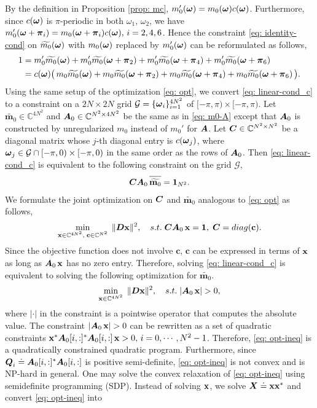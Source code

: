 By the definition in Proposition \ref{prop: mc}, $m_0'(\boldsymbol{\omega}) = m_0(\boldsymbol{\omega})c(\boldsymbol{\omega})$. Furthermore, since $c(\boldsymbol{\omega})$ is $\pi$-periodic in both $\omega_1,\,\omega_2$, we have $m_0'(\boldsymbol{\omega}+\boldsymbol{\pi}_i) = m_0(\boldsymbol{\omega}+\boldsymbol{\pi}_i)c(\boldsymbol{\omega}),\, i = 2,4,6$. Hence the constraint \eqref{eq: identity-cond} on $\widetilde{m_{0}}(\boldsymbol{\omega})$ with $m_0(\boldsymbol{\omega})$ replaced by $m_0'(\boldsymbol{\omega})$ can be reformulated as follows,
\begin{align}
1 & = m_0'\widetilde{m_{0}}(\boldsymbol{\omega}) + m_0'\widetilde{m_{0}}(\boldsymbol{\omega}+\boldsymbol{\pi}_{2}) + m_0'\widetilde{m_{0}}(\boldsymbol{\omega}+\boldsymbol{\pi}_{4}) + m_0'\widetilde{m_{0}}(\boldsymbol{\omega}+\boldsymbol{\pi}_{6})\notag\\
& = c(\boldsymbol{\omega})\big(\,m_0\widetilde{m_{0}}(\boldsymbol{\omega}) + m_0\widetilde{m_{0}}(\boldsymbol{\omega}+\boldsymbol{\pi}_{2}) + m_0\widetilde{m_{0}}(\boldsymbol{\omega}+\boldsymbol{\pi}_{4}) + m_0\widetilde{m_{0}}(\boldsymbol{\omega}+\boldsymbol{\pi}_{6})\,\big).\label{eq: linear-cond_c}
\end{align}
Using the same setup of the optimization \eqref{eq: opt}, we convert \eqref{eq: linear-cond_c} to a constraint on a $2N\times 2N$ grid $\mathcal{G}=\{\boldsymbol{\omega}_i\}_{i=1}^{4N^2}$ of $[-\pi,\pi)\times[-\pi,\pi)$.
Let $\widetilde{\mathbf{m}_0}\in\mathbb{C}^{4N^2}$ and $\boldsymbol{A}_0\in\mathbb{C}^{N^2\times 4N^2}$ be the same as in \eqref{eq: m0-A} except that $\boldsymbol{A}_0$ is constructed by unregularized $m_0$ instead of $m_0'$ for $\boldsymbol{A}$.
Let $\boldsymbol{C}\in\mathbb{C}^{N^2\times N^2}$ be a diagonal matrix whose $j$-th diagonal entry is $c(\boldsymbol{\omega}_j)$, where $\boldsymbol{\omega}_j\in \mathcal{G}\cap [-\pi,0)\times[-\pi,0)$ in the same order as the rows of $\boldsymbol{A}_0$. Then \eqref{eq: linear-cond_c} is equivalent to the following constraint on the grid $\mathcal{G}$,
\begin{align}
\V{C}\V{A}_0\,\overlinespace{\widetilde{\mathbf{m}_0}} = \V{1}_{N^2}.
\end{align}
We formulate the joint optimization on $\boldsymbol{C}$ and $\widetilde{\mathbf{m}_0}$ analogous to \eqref{eq: opt} as follows,
\begin{align}\label{eq: opt-C}
\min_{\mathbf{x}\in\mathbb{C}^{4N^2},\;\mathbf{c}\in\mathbb{C}^{N^2}}\; \Vert \boldsymbol{D}\mathbf{x}\Vert^2,\quad 
s.t. \; \boldsymbol{C}\boldsymbol{A}_0\,\mathbf{x} = \mathbf{1}, \; \boldsymbol{C} = diag(\mathbf{c}).
\end{align}
Since the objective function does not involve $\mathbf{c}$, $\mathbf{c}$ can be expressed in terms of $\mathbf{x}$ as long as $\boldsymbol{A}_0\,\mathbf{x}$ has no zero entry. Therefore, solving \eqref{eq: linear-cond_c} is equivalent to solving the following optimization for $\widetilde{\mathbf{m}_0}$.
\begin{align}\label{eq: opt-ineq}
\min_{\mathbf{x}\in\mathbb{C}^{4N^2}}\; \Vert \boldsymbol{D}\mathbf{x}\Vert^2,\quad 
s.t. \; |\boldsymbol{A}_0\,\mathbf{x}| > 0,
\end{align}
where $|\cdot|$ in the constraint is a pointwise operator that computes the absolute value. The constraint $|\boldsymbol{A}_0\,\mathbf{x}| > 0$ can be rewritten as a set of quadratic constraints $\mathbf{x}^*\boldsymbol{A}_0[i,:]^*\boldsymbol{A}_0[i,:]\,\mathbf{x} > 0,\, i =0,\cdots, N^2-1 $. Therefore, \eqref{eq: opt-ineq} is a quadratically constrained quadratic program. Furthermore, since $\boldsymbol{Q}_i\doteq \boldsymbol{A}_0[i,:]^*\boldsymbol{A}_0[i,:]$ is positive semi-definite, \eqref{eq: opt-ineq} is not convex and is NP-hard in general. One may solve the convex relaxation of \eqref{eq: opt-ineq} using semidefinite programming (SDP). Instead of solving $\mathbf{x}$, we solve $\boldsymbol{X}\doteq \mathbf{x}\mathbf{x}^*$ and convert \eqref{eq: opt-ineq} into 
